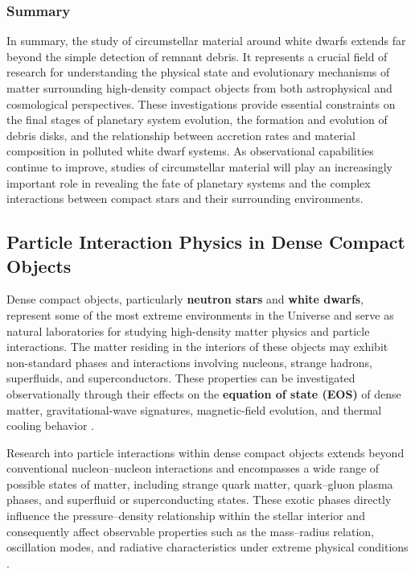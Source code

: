 \subsubsection{Summary}

In summary, the study of circumstellar material around white dwarfs extends far beyond the simple detection of remnant debris. It represents a crucial field of research for understanding the physical state and evolutionary mechanisms of matter surrounding high-density compact objects from both astrophysical and cosmological perspectives. These investigations provide essential constraints on the final stages of planetary system evolution, the formation and evolution of debris disks, and the relationship between accretion rates and material composition in polluted white dwarf systems. As observational capabilities continue to improve, studies of circumstellar material will play an increasingly important role in revealing the fate of planetary systems and the complex interactions between compact stars and their surrounding environments.

\subsection{Particle Interaction Physics in Dense Compact Objects}\label{particle-interaction-physics-in-dense-compact-objects}

Dense compact objects, particularly \textbf{neutron stars} and \textbf{white dwarfs}, represent some of the most extreme environments in the Universe and serve as natural laboratories for studying high-density matter physics and particle interactions. The matter residing in the interiors of these objects may exhibit non-standard phases and interactions involving nucleons, strange hadrons, superfluids, and superconductors. These properties can be investigated observationally through their effects on the \textbf{equation of state (EOS)} of dense matter, gravitational-wave signatures, magnetic-field evolution, and thermal cooling behavior \cite{lattimer2007,ozel2016}.

Research into particle interactions within dense compact objects extends beyond conventional nucleon--nucleon interactions and encompasses a wide range of possible states of matter, including strange quark matter, quark--gluon plasma phases, and superfluid or superconducting states. These exotic phases directly influence the pressure--density relationship within the stellar interior and consequently affect observable properties such as the mass--radius relation, oscillation modes, and radiative characteristics under extreme physical conditions \cite{baym2018,raaijmakers2021b}.

